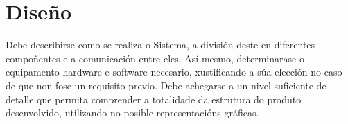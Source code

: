 \chapter{Diseño}

Debe describirse como se realiza o Sistema, a división deste en diferentes compoñentes e a comunicación entre eles. Así mesmo, determinarase o equipamento hardware e software necesario, xustificando a súa elección no caso de que non fose un requisito previo. Debe achegarse a un nivel suficiente de detalle que permita comprender a totalidade da estrutura do produto desenvolvido, utilizando no posible representacións gráficas.